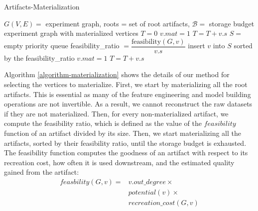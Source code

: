 \begin{algorithm}[h]
\caption{Artifacts-Materialization}\label{algorithm-materialization}
\begin{algorithmic}[1]
\Require  $G(V,E)=$ experiment graph, roots = set of root artifacts, $\mathcal{B}=$ storage budget
\Ensure experiment graph with materialized vertices
\State $T= 0$ 
 
		\State $v.mat = 1$
		\State $T = T + v.s$
	\EndIf
\EndFor
\State $S = $ empty priority queue
		\State feasibility\_ratio $= \dfrac{\text{feasibility}(G, v)}{v.s}$
		\State insert $v$ into $S$ sorted by the feasibility\_ratio
	\EndIf
\EndFor
{}
		\State $v.mat = 1$
		\State $T = T + v.s$		
	\EndIf
\EndFor
\end{algorithmic}
\end{algorithm}
Algorithm \ref{algorithm-materialization} shows the details of our method for selecting the vertices to materialize.
First, we start by materializing all the root artifacts.
This is essential as many of the feature engineering and model building operations are not invertible.
As a result, we cannot reconstruct the raw datasets if they are not materialized.
Then, for every non-materialized artifact, we compute the feasibility ratio, which is defined as the value of the $feasibility$ function of an artifact divided by its size.
Then, we start materializing all the artifacts, sorted by their feasibility ratio, until the storage budget is exhausted.
The feasibility function computes the goodness of an artifact with respect to its recreation cost, how often it is used downstream, and the estimated quality gained from the artifact:
\begin{equation}
\begin{split}
feasbility(G,v) = 	& v.out\_degree \times\\
								&	potential(v) \times \\
								& recreation\_cost(G,v)  
 \end{split}
\end{equation}
